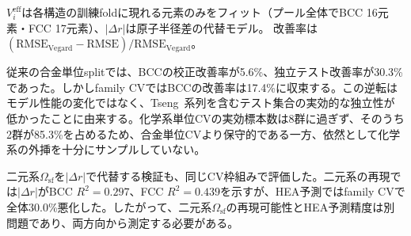\documentclass[5p,10pt]{elsarticle}
\begin{document}
\begin{table}[!t]
\centering
\caption{化学系単位およびelement-set単位のCV（RMSE / \AA、括弧内はVegard比改善率）。全体/BCC/FCCの$n$は95/46/49。family CVは8群、element-set CVは49群をleave-one-group-outで評価した。}
\label{tab:robust_cv}
\scriptsize
{}
\par\smallskip
{\scriptsize $V_i^\mathrm{eff}$は各構造の訓練foldに現れる元素のみをフィット（プール全体でBCC 16元素・FCC 17元素）、$|\Delta r|$は原子半径差の代替モデル。
改善率は$(\mathrm{RMSE}_\mathrm{Vegard}-\mathrm{RMSE})/\mathrm{RMSE}_\mathrm{Vegard}$。}
\end{table}

従来の合金単位splitでは、BCCの校正改善率が5.6\%、独立テスト改善率が30.3\%であった。しかしfamily CVではBCCの改善率は17.4\%に収束する。この逆転はモデル性能の変化ではなく、Tseng~\cite{Tseng2019}系列を含むテスト集合の実効的な独立性が低かったことに由来する。化学系単位CVの実効標本数は8群に過ぎず、そのうち2群が85.3\%を占めるため、合金単位CVより保守的である一方、依然として化学系の外挿を十分にサンプルしていない。

二元系$\Omega_\text{sf}$を$|\Delta r|$で代替する検証も、同じCV枠組みで評価した。二元系の再現では$|\Delta r|$がBCC $R^2=0.297$、FCC $R^2=0.439$を示すが、HEA予測ではfamily CVで全体30.0\%悪化した。したがって、二元系$\Omega_\text{sf}$の再現可能性とHEA予測精度は別問題であり、両方向から測定する必要がある。
\end{document}
